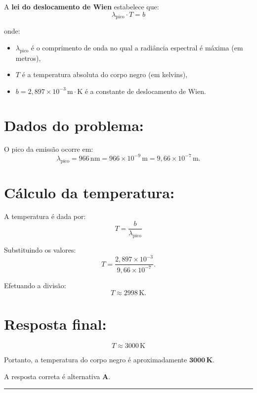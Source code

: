 \documentclass[a4paper,12pt]{article}
\begin{document}
\begin{flushleft}
A \textbf{lei do deslocamento de Wien} estabelece que:
\[
\lambda_{\text{pico}} \cdot T = b
\]

onde:
\begin{itemize}
    \item \( \lambda_{\text{pico}} \) é o comprimento de onda no qual a radiância espectral é máxima (em metros),
    \item \( T \) é a temperatura absoluta do corpo negro (em kelvins),
    \item \( b = 2,897 \times 10^{-3} \, \mathrm{m\cdot K} \) é a constante de deslocamento de Wien.
\end{itemize}

\section*{Dados do problema:}

O pico da emissão ocorre em:
\[
\lambda_{\text{pico}} = 966 \, \mathrm{nm} = 966 \times 10^{-9} \, \mathrm{m} = 9,66 \times 10^{-7} \, \mathrm{m}.
\]

\section*{Cálculo da temperatura:}

A temperatura é dada por:
\[
T = \frac{b}{\lambda_{\text{pico}}}
\]

Substituindo os valores:
\[
T = \frac{2,897 \times 10^{-3}}{9,66 \times 10^{-7}}.
\]

Efetuando a divisão:
\[
T \approx 2998 \, \mathrm{K}.
\]

\section*{Resposta final:}

\[
\boxed{
T \approx 3000 \, \mathrm{K}
}
\]

Portanto, a temperatura do corpo negro é aproximadamente \( \mathbf{3000\,K} \).

A resposta correta é alternativa \colorbox{green!50}{\textbf{A}}.
\end{flushleft}

\noindent\rule{\linewidth}{0.6pt}\\
\end{document}
